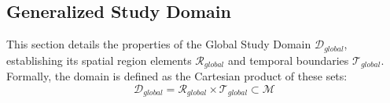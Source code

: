 




\subsection{Generalized Study Domain}
\label{sec:generalized_study_domain}

This section details the properties of the Global Study Domain $\mathcal{D}_{global}$, establishing its spatial region elements $\mathcal{R}_{global}$ and temporal boundaries $\mathcal{T}_{global}$. Formally, the domain is defined as the Cartesian product of these sets:
\begin{equation}
    \mathcal{D}_{global} = \mathcal{R}_{global} \times \mathcal{T}_{global} \subset \mathcal{M}
\end{equation}

